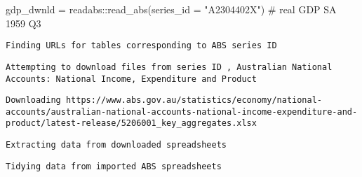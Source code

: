 \documentclass[
  letterpaper,
  DIV=11,
  numbers=noendperiod]{scrreprt}
\newenvironment{Shaded}{\begin{snugshade}}{\end{snugshade}}
\newcommand{\AttributeTok}[1]{\textcolor[rgb]{0.40,0.45,0.13}{#1}}
\newcommand{\CommentTok}[1]{\textcolor[rgb]{0.37,0.37,0.37}{#1}}
\newcommand{\FunctionTok}[1]{\textcolor[rgb]{0.28,0.35,0.67}{#1}}
\newcommand{\NormalTok}[1]{\textcolor[rgb]{0.00,0.23,0.31}{#1}}
\newcommand{\OtherTok}[1]{\textcolor[rgb]{0.00,0.23,0.31}{#1}}
\newcommand{\SpecialCharTok}[1]{\textcolor[rgb]{0.37,0.37,0.37}{#1}}
\newcommand{\StringTok}[1]{\textcolor[rgb]{0.13,0.47,0.30}{#1}}
\begin{document}
\begin{Shaded}
\begin{Highlighting}[]
\NormalTok{gdp\_dwnld   }\OtherTok{=}\NormalTok{ readabs}\SpecialCharTok{::}\FunctionTok{read\_abs}\NormalTok{(}\AttributeTok{series\_id =} \StringTok{"A2304402X"}\NormalTok{)  }\CommentTok{\# real GDP SA 1959 Q3}
\end{Highlighting}
\end{Shaded}

\begin{verbatim}
Finding URLs for tables corresponding to ABS series ID 
\end{verbatim}

\begin{verbatim}
Attempting to download files from series ID , Australian National Accounts: National Income, Expenditure and Product
\end{verbatim}

\begin{verbatim}
Downloading https://www.abs.gov.au/statistics/economy/national-accounts/australian-national-accounts-national-income-expenditure-and-product/latest-release/5206001_key_aggregates.xlsx
\end{verbatim}

\begin{verbatim}
Extracting data from downloaded spreadsheets
\end{verbatim}

\begin{verbatim}
Tidying data from imported ABS spreadsheets
\end{verbatim}
\end{document}
